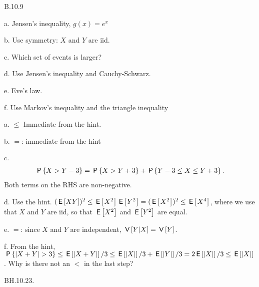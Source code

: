\begin{exercise}
B.10.9
\begin{hint}
a. Jensen's inequality, $g(x)=e^x$

b. Use symmetry: $X$ and $Y$ are iid.

c. Which set of events is larger?

d.
Use Jensen's inequality and Cauchy-Schwarz.

e. Eve's law.

f. Use Markov's inequality and  the triangle inequality
\end{hint}
\begin{solution}
a. $\leq$ Immediate from the hint.

b. $=$: immediate from the hint

c.
\begin{align*}
\P{X>Y-3} =  \P{X>Y+3} + \P{Y-3\leq X \leq Y+3}.
\end{align*}
Both terms on the RHS are non-negative.

d. Use the hint. $(\E{XY})^{2} \leq \E{X^2}\E{Y^2} =(\E{X^2})^{2} \leq \E{X^4}$, where we use that  $X$ and $Y$ are iid, so that $\E{X^2}$ and $\E{Y^2}$ are equal.

e. $=$: since $X$ and $Y$ are independent, $\V{Y|X} = \V Y$.

f. From the hint,  $\P{|X+Y|>3} \leq \E{|X+Y|}/3 \leq \E{|X|}/3 + \E{|Y|}/3 = 2\E{|X|}/3 \leq \E{|X|}$. Why is there not an $<$ in the last step?
\end{solution}
\end{exercise}

\begin{exercise}
BH.10.23.
\end{exercise}

